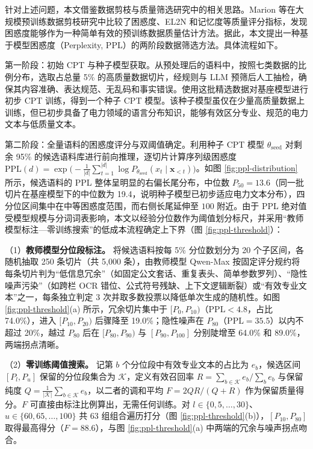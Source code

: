 \documentclass[fontset=fandol,type=master,campus=shenzhen,etitleauto=true]{hithesisbook}
\begin{document}
针对上述问题，本文借鉴数据剪枝与质量筛选研究中的相关思路。Marion 等在大规模预训练数据剪枝研究中比较了困惑度、EL2N 和记忆度等质量评分指标，发现困惑度能够作为一种简单有效的预训练数据质量估计方法\cite{ref58}。据此，本文提出一种基于模型困惑度（Perplexity, PPL）的两阶段数据筛选方法。具体流程如下。

第一阶段：初始 CPT 与种子模型获取。从预处理后的语料中，按照七类数据的比例分布，选取占总量 5\% 的高质量数据切片，经规则与 LLM 预筛后人工抽检，确保其内容准确、表达规范、无乱码和事实错误。使用这批精选数据对基座模型进行初步 CPT 训练，得到一个种子 CPT 模型。该种子模型虽仅在少量高质量数据上训练，但已初步具备了电力领域的语言分布知识，能够有效区分专业、规范的电力文本与低质量文本。

第二阶段：全量语料的困惑度评分与双阈值确定。利用种子 CPT 模型 $\theta_{\text{seed}}$ 对剩余 95\% 的候选语料库进行前向推理，逐切片计算序列级困惑度 $\text{PPL}(d) = \exp\bigl(-\frac{1}{|d|}\sum_{t=1}^{|d|} \log P_{\theta_{\text{seed}}}(x_t \mid \mathbf{x}_{<t})\bigr)$。如图 \ref{fig:ppl-distribution} 所示，候选语料的 PPL 整体呈明显的右偏长尾分布，中位数 $P_{50} = 13.6$（同一批切片在基座模型下的中位数为 19.4，说明种子模型已初步适应电力文本分布），四分位区间集中在中等困惑度范围，而右侧长尾延伸至 $100$ 附近。由于 PPL 绝对值受模型规模与分词词表影响，本文以经验分位数作为阈值划分标尺，并采用“教师模型标注—零训练搜索”的低成本流程确定上下界（图 \ref{fig:ppl-threshold}）：

（1）\textbf{教师模型分位段标注。} 将候选语料按每 5\% 分位数划分为 20 个子区间，各随机抽取 250 条切片（共 5,000 条），由教师模型 Qwen-Max 按固定评分规约将每条切片判为“低信息冗余”（如固定公文套话、重复表头、简单参数罗列）、“隐性噪声污染”（如跨栏 OCR 错位、公式符号残缺、上下文逻辑断裂）或“有效专业文本”之一，每条独立判定 3 次并取多数投票以降低单次生成的随机性。如图 \ref{fig:ppl-threshold}(a) 所示，冗余切片集中于 $[P_0, P_{10})$（$\text{PPL} < 4.8$，占比 74.0\%），进入 $[P_{10}, P_{20})$ 后骤降至 19.0\%；隐性噪声在 $P_{80}$（$\text{PPL} = 35.5$）以内不超过 20\%，越过 $P_{80}$ 后在 $[P_{80}, P_{90})$ 与 $[P_{90}, P_{100}]$ 分别陡增至 64.0\% 和 89.0\%，两端拐点清晰。

（2）\textbf{零训练阈值搜索。} 记第 $b$ 个分位段中有效专业文本的占比为 $e_b$，候选区间 $[P_l, P_u]$ 保留的分位段集合为 $\mathcal{K}$，定义有效召回率 $R = \sum_{b \in \mathcal{K}} e_b / \sum_{b} e_b$ 与保留纯度 $Q = \frac{1}{|\mathcal{K}|}\sum_{b \in \mathcal{K}} e_b$，以二者的调和平均 $F = 2QR/(Q+R)$ 作为保留质量得分。$F$ 可直接由标注比例算出，无需任何训练。对 $l \in \{0, 5, \dots, 30\}$、$u \in \{60, 65, \dots, 100\}$ 共 63 组组合遍历打分（图 \ref{fig:ppl-threshold}(b)），$[P_{10}, P_{80}]$ 取得最高得分（$F = 88.6$），与图 \ref{fig:ppl-threshold}(a) 中两端的冗余与噪声拐点吻合。
\end{document}
